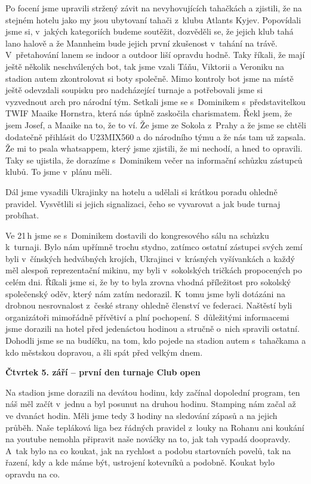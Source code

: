 \documentclass[11pt]{article}
\begin{document}
Po focení jsme upravili stržený závit na nevyhovujících tahačkách a zjistili, že na stejném hotelu jako my jsou ubytovaní tahači z~klubu Atlants Kyjev. Popovídali jsme si, v~jakých kategoriích budeme soutěžit, dozvěděli se, že jejich klub tahá lano halově a že Mannheim bude jejich první zkušenost v~tahání na trávě. V~přetahování lanem se indoor a outdoor liší opravdu hodně. Taky říkali, že mají ještě několik neschválených bot, tak jsme vzali Táňu, Viktorii a Veroniku na stadion autem zkontrolovat si boty společně. Mimo kontroly bot jsme na místě ještě odevzdali soupisku pro nadcházející turnaje a potřebovali jsme si vyzvednout arch pro národní tým. Setkali jsme se s~Dominikem s~představitelkou TWIF Maaike Hornstra, která nás úplně zaskočila charismatem. Řekl jsem, že jsem Josef, a Maaike na to, že to ví. Že jsme ze Sokola z~Prahy a že jsme se chtěli dodatečně přihlásit do U23MIX560 a do národního týmu a že nás tam už zapsala. Že mi to psala whatsappem, který jsme zjistili, že mi nechodí, a hned to opravili. Taky se ujistila, že dorazíme s~Dominikem večer na informační schůzku zástupců klubů. To jsme v~plánu měli.

Dál jsme vysadili Ukrajinky na hotelu a udělali si krátkou poradu ohledně pravidel. Vysvětlili si jejich signalizaci, čeho se vyvarovat a jak bude turnaj probíhat.

Ve 21\,h jsme se s~Dominikem dostavili do kongresového sálu na schůzku k~turnaji. Bylo nám upřímně trochu stydno, zatímco ostatní zástupci svých zemí byli v~čínských hedvábných krojích, Ukrajinci v~krásných vyšívankách a každý měl alespoň reprezentační mikinu, my byli v~sokolských tričkách propocených po celém dni. Říkali jsme si, že by to byla zrovna vhodná příležitost pro sokolský společenský oděv, který nám zatím nedorazil. K~tomu jsme byli dotázáni na drobnou nesrovnalost z~české strany ohledně členství ve federaci. Naštěstí byli organizátoři mimořádně přívětiví a plní pochopení. S~důležitými informacemi jsme dorazili na hotel před jedenáctou hodinou a stručně o~nich spravili ostatní. Dohodli jsme se na budíčku, na tom, kdo pojede na stadion autem s~tahačkama a kdo městskou dopravou, a šli spát před velkým dnem.


\vspace*{12pt}
\noindent\textbf{Čtvrtek 5. září – první den turnaje Club open}
\vspace*{6pt}

\noindent
Na stadion jsme dorazili na devátou hodinu, kdy začínal dopolední program, ten náš měl začít v~jednu a byl posunut na druhou hodinu. Stamping nám začal až ve dvanáct hodin. Měli jsme tedy 3 hodiny na sledování zápasů a na jejich průběh. Naše tepláková liga bez řádných pravidel z~louky na Rohanu ani koukání na youtube nemohla připravit naše nováčky na to, jak tah vypadá doopravdy. A~tak bylo na co koukat, jak na rychlost a podobu startovních povelů, tak na řazení, kdy a kde máme být, ustrojení kotevníků a podobně. Koukat bylo opravdu na co.
\end{document}
